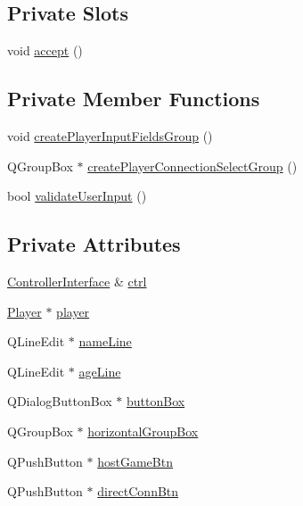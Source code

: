 \subsection*{Private Slots}
\begin{DoxyCompactItemize}
\item 
void \hyperlink{classGUI_1_1PlayerForm_aadb9f3b844fb4cf98288cd3c60a3af91}{accept} ()
\end{DoxyCompactItemize}
\subsection*{Private Member Functions}
\begin{DoxyCompactItemize}
\item 
void \hyperlink{classGUI_1_1PlayerForm_a075b75384a607ade082a49f4e05a908d}{create\+Player\+Input\+Fields\+Group} ()
\item 
Q\+Group\+Box $\ast$ \hyperlink{classGUI_1_1PlayerForm_a4964adc00f23438b45887af6a767f09c}{create\+Player\+Connection\+Select\+Group} ()
\item 
bool \hyperlink{classGUI_1_1PlayerForm_ad56866bf1cf64173068b9932ce8e6452}{validate\+User\+Input} ()
\end{DoxyCompactItemize}
\subsection*{Private Attributes}
\begin{DoxyCompactItemize}
\item 
\hyperlink{classControllerInterface}{Controller\+Interface} \& \hyperlink{classGUI_1_1PlayerForm_a15e61471831211a4301410bdd802a4a4}{ctrl}
\item 
\hyperlink{classPlayer}{Player} $\ast$ \hyperlink{classGUI_1_1PlayerForm_a96781128d3743da3d17e0fdd91afba7b}{player}
\item 
Q\+Line\+Edit $\ast$ \hyperlink{classGUI_1_1PlayerForm_a8faa8074b2f9d7f9f4471b1ad61b4c65}{name\+Line}
\item 
Q\+Line\+Edit $\ast$ \hyperlink{classGUI_1_1PlayerForm_a54e5ef4f421180fa1ce8eede3fcfaf53}{age\+Line}
\item 
Q\+Dialog\+Button\+Box $\ast$ \hyperlink{classGUI_1_1PlayerForm_a4d76db11c020d3d895f14dcecf268a95}{button\+Box}
\item 
Q\+Group\+Box $\ast$ \hyperlink{classGUI_1_1PlayerForm_af458ad810116b1284b175480c1a3640e}{horizontal\+Group\+Box}
\item 
Q\+Push\+Button $\ast$ \hyperlink{classGUI_1_1PlayerForm_a2ae9cb3ec8281a3b0b35124cc17c3f3f}{host\+Game\+Btn}
\item 
Q\+Push\+Button $\ast$ \hyperlink{classGUI_1_1PlayerForm_a5890045743cc294ab7d3f08d104818a7}{direct\+Conn\+Btn}
\end{DoxyCompactItemize}


